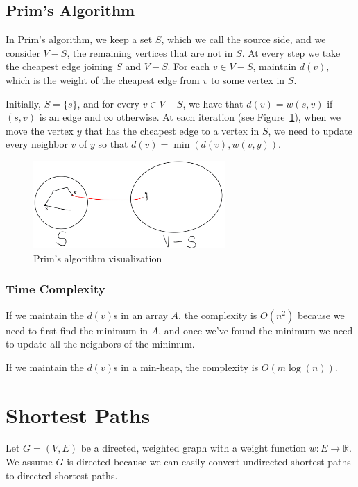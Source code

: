 \subsection{Prim's Algorithm}

In Prim's algorithm, we keep a set $S$, which we call the source side,
and we consider $V - S$, the remaining vertices that are not in $S$.
At every step we take the cheapest edge joining $S$ and
$V - S$. For each $v \in V - S$, maintain $d(v)$, which is the
weight of the cheapest edge from $v$ to some vertex in $S$. 

Initially, $S = \{ s \}$, and for every $v \in V - S$, we have that
$d(v) = w(s, v)$ if $(s, v)$ is an edge and $\infty$ otherwise. At
each iteration (see Figure~\ref{fig:prim}), when we move the vertex
$y$ that has the cheapest edge to a vertex in $S$, we need to update
every neighbor $v$ of $y$ so that $d(v) = \min(d(v), w(v, y))$.

\begin{figure}[hpt]
    \centering
    \includegraphics[width=0.65\textwidth]{figures/prim.jpeg}
    \caption{Prim's algorithm visualization}
    \label{fig:prim}
\end{figure}

\subsubsection{Time Complexity}

If we maintain the $d(v)$s in an array $A$, the complexity is $O(n^2)$
because we need to first find the minimum in $A$, and once we've found
the minimum we need to update all the neighbors of the minimum.

If we maintain the $d(v)$s in a min-heap, the complexity is $O(m\log
(n))$.

\section{Shortest Paths}

Let $G = (V, E)$ be a directed, weighted graph with a weight function
$w : E \to \mathbb{R}$. We assume $G$ is directed because we can
easily convert undirected shortest paths to directed shortest paths.

